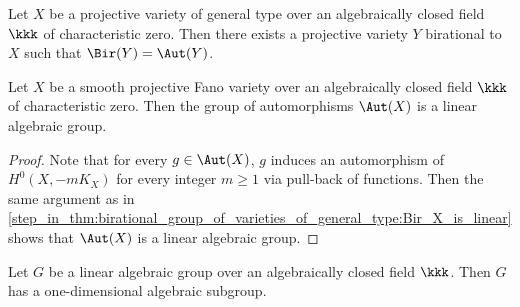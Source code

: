     \begin{corollary}\label{cor:regularization_of_birational_group_of_varieties_of_general_type}
        Let \(X\) be a projective variety of general type over an algebraically closed field \(\kkk\) of characteristic zero. 
        Then there exists a projective variety \(Y\) birational to \(X\) such that \(\Bir(Y) = \Aut(Y)\).
    \end{corollary}

    \begin{corollary}\label{cor:automorphism_group_of_Fano_varieties_is_linear}
        Let \(X\) be a smooth projective Fano variety over an algebraically closed field \(\kkk\) of characteristic zero. 
        Then the group of automorphisms \(\Aut(X)\) is a linear algebraic group.
    \end{corollary}
    \begin{proof}
        Note that for every \(g \in \Aut(X)\), \(g\) induces an automorphism of \(H^0(X, -mK_X)\) for every integer \(m \geq 1\) via pull-back of functions.
        Then the same argument as in \cref{step_in_thm:birational_group_of_varieties_of_general_type:Bir_X_is_linear} shows that \(\Aut(X)\) is a linear algebraic group.
    \end{proof}

    \begin{lemma}\label{lem:any_linear_alg_gp_has_one_dimensional_alg_subgroup}
        Let \(G\) be a linear algebraic group over an algebraically closed field \(\kkk\). 
        Then \(G\) has a one-dimensional algebraic subgroup.
    \end{lemma}

    
